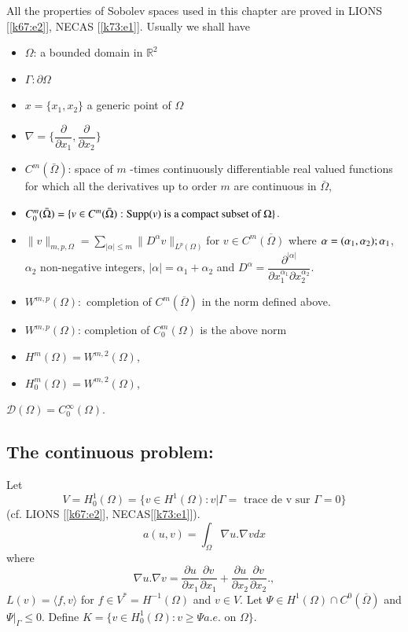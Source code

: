 \begin{notations}
All the properties of Sobolev spaces used in this chapter are proved
in LIONS [\ref{k67:e2}], NECAS [\ref{k73:e1}]. Usually we shall have  
\begin{itemize}
\item $ \Omega$: a bounded domain in $\mathbb{R}^2$
\item $\Gamma: \partial \Omega$
\item $x = \{x_1, x_2\}$ a generic point of $\Omega$
\item $\nabla = \{\dfrac{\partial}{\partial x_1},
  \dfrac{\partial}{\partial x_2}\}$ 
\item $C^m (\bar{\Omega})$: space of $m$ -times continuously
  differentiable real valued functions for which all the derivatives
  up to order $m$ are continuous in $\bar{\Omega}$, 
\item $C^m_0(\bar{\Omega}) = \{v \in C^m(\bar{\Omega}): \operatorname{Supp} (v)
  \text{ is a compact subset of } \Omega \}$.  
\item $ \parallel  v \parallel  _{m,  p,  \Omega} = \sum\limits_{| \alpha | \leq m} \parallel 
  D^\alpha v \parallel  _{L^p(\Omega)}$\pageoriginale for $v \in
  C^{m}\overline{(\Omega)}$ where $\alpha =  (\alpha_1, \alpha_2);\break
  \alpha_1$, $\alpha_2$ non-negative integers, $|\alpha| = \alpha_1 +
  \alpha_2$ and $D^\alpha = \dfrac{\partial ^{|\alpha|}}{\partial
 x_1^{\alpha_1} \partial x^{\alpha_2}_2}$.  
\item $W^{m, p} (\Omega):$ completion of $C^m(\overline{\Omega})$ in
  the norm defined above. 
\item $W^{m, p}(\Omega)$: completion of $C^m_0 (\Omega)$ is the above
  norm 
\item $H^m (\Omega) = W^{m, 2}(\Omega)$, 
\item  $H^m_0(\Omega) =  W^{m, 2}(\Omega)$,
\end{itemize}
\end{notations}
 $\mathscr{D} (\Omega) = C^\infty_0 (\Omega)$. 
 
\subsection{The continuous problem:}\label{c2:ss2.1} 
Let  %
$$
V = H^1_0 (\Omega) = \{v \in H^1 (\Omega) : v | 
\Gamma = \text{ trace de v sur } \Gamma = 0  \} 
$$
(cf. LIONS [\ref{k67:e2}], NECAS[\ref{k73:e1}]). 
$$
a(u, v) = \int_\Omega \nabla u. \nabla v dx 
$$
where 
$$
\nabla u. \nabla v = \frac{\partial u} {\partial
  x_1} \frac{\partial v}{\partial x_1} + \frac{\partial u}{\partial
  x_2} \frac{\partial v}{\partial x_2}., 
$$
$L (v) = \langle f, v \rangle$ for $f \in V^* = H^{-1} (\Omega)$
and $v \in V$. Let $\Psi \in H^1 (\Omega) \cap C^0
(\overline{\Omega})$ and $\Psi |_\Gamma \leq 0$. Define $K = \{v
\in H^1_0 (\Omega) : v \geq \Psi a.e.$ on $\Omega \}$. 
 
